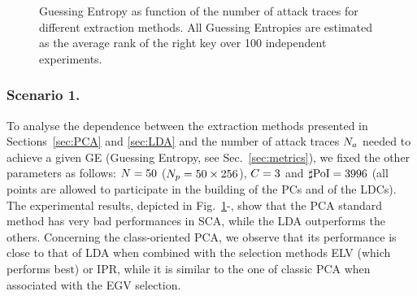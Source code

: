 \begin{figure}[t]
\caption[Guessing Entropy as function of the number of attack traces]{Guessing Entropy as function of the number of attack traces for different extraction methods. All Guessing Entropies are estimated as the average rank of the right key over 100 independent experiments.}\label{fig:scenario1}
\end{figure}
\subsubsection{Scenario 1.}
To analyse the dependence between the extraction methods presented in Sections~\ref{sec:PCA} and \ref{sec:LDA} and the number of attack traces $N_a$ needed to achieve a given GE (Guessing Entropy, see Sec.~\ref{sec:metrics}), we fixed the other parameters as follows: $N=50$ ($N_p=50\times 256$), $C = 3$ and $\sharp\mathrm{PoI} = 3996$ (all points are allowed to participate in the building of the PCs and of the LDCs). The experimental results, depicted in Fig.~\ref{fig:scenario1}-, show that the PCA standard method has very bad performances in SCA, while the LDA outperforms the others. Concerning the class-oriented PCA, we observe that its performance is close to that of LDA when combined with the selection methods ELV (which performs best) or IPR, while it is similar to the one of classic PCA when associated with the EGV selection.



